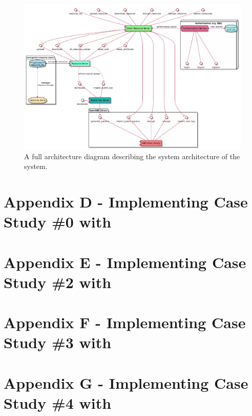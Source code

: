 \begin{appendices}
\begin{figure}[htp]
    \centering
    \label{fig:appendix_sys_arch_full}
    \includegraphics[width=\linewidth,keepaspectratio]{appendices/diagrams/infrastructure/system_architecture.pdf}

    \caption{
      A full architecture diagram describing the system architecture of the \theResServer system.
    }

\end{figure}

\section{Appendix D - Implementing Case Study \#0 with \thePolicyLang}
\label{appendix:case_study_0_policy}



\section{Appendix E - Implementing Case Study \#2 with \thePolicyLang}
\label{appendix:case_study_2_policy}



\section{Appendix F - Implementing Case Study \#3 with \thePolicyLang}
\label{appendix:case_study_3_policy}



\section{Appendix G - Implementing Case Study \#4 with \thePolicyLang}
\label{appendix:case_study_4_policy}


\end{appendices}
